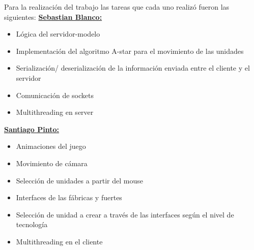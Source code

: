 Para la realización del trabajo las tareas que cada uno realizó fueron
las siguientes:
\hfill \break
\underline{\textbf{Sebastian Blanco:}}

    \begin{itemize}
        \item Lógica del servidor-modelo
        \item Implementación del algoritmo A-star para el movimiento de las unidades
        \item Serialización/ deserialización de la información enviada entre el cliente y el servidor
        \item Comunicación de sockets
        \item Multithreading en server
    \end{itemize}
\hfill \break
\underline{\textbf{Santiago Pinto:}}

    \begin{itemize}
        \item Animaciones del juego
        \item Movimiento de cámara
        \item Selección de unidades a partir del mouse
        \item Interfaces de las fábricas y fuertes
        \item Selección de unidad a crear a través de las interfaces según el nivel de tecnología
        \item Multithreading en el cliente
    \end{itemize}